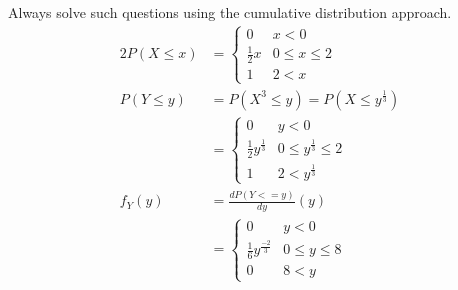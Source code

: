 \documentclass[../../probability-notes.tex]{subfiles}
\begin{document}
        Always solve such questions using the cumulative distribution approach.
        \begin{alignat*}{2}
            P(X \leq x) &= \begin{cases} 0 &\mbox{$x < 0$}\\
                                        \frac{1}{2} x &\mbox{$0 \leq x \leq 2$}\\
                                        1 &\mbox{$2 < x$} \end{cases}\\
            P(Y \leq y) &= P(X^{3} \leq y) = P(X \leq y^{\frac{1}{3}})\\
                        &= \begin{cases}  0 &\mbox{$y < 0$}\\
                                            \frac{1}{2} y^{\frac{1}{3}} &\mbox{$0 \leq y^{\frac{1}{3}} \leq 2$}\\
                                            1 &\mbox{$2 < y^{\frac{1}{3}}$} \end{cases}\\
            f_{Y}(y) &= \frac{dP(Y <= y)}{dy}(y)\\
                     &= \begin{cases}  0 &\mbox{$y < 0$}\\
                                            \frac{1}{6} y^{\frac{-2}{3}} &\mbox{$0 \leq y \leq 8$}\\
                                            0 &\mbox{$8 < y$} \end{cases}
        \end{alignat*}
\end{document}
